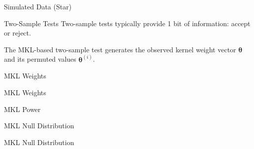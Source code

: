 \documentclass{beamer}
\begin{document}
\begin{frame}{Simulated Data (Star)}
  \begin{center}
    \resizebox{10.0cm}{!}{
      
    }
  \end{center}
\end{frame}

\begin{frame}{Two-Sample Tests}
  Two-sample tests typically provide 1 bit of information: accept or reject. \\ \pause

  The MKL-based two-sample test generates the observed kernel weight vector ${\boldsymbol \theta}$ and
  its permuted values ${\boldsymbol \theta}^{(i)}$.
\end{frame}

\begin{frame}{MKL Weights}
  \begin{center}
    \resizebox{10.0cm}{!}{
      
    }
  \end{center}
\end{frame}

\begin{frame}{MKL Weights}
  \begin{center}
    \resizebox{10.0cm}{!}{
      
    }
  \end{center}
\end{frame}

\begin{frame}{MKL Power}
  \begin{center}
    \resizebox{10.0cm}{!}{
      
    }
  \end{center}
\end{frame}

\begin{frame}{MKL Null Distribution}
  \begin{center}
    \resizebox{10.0cm}{!}{
      
    }
  \end{center}
\end{frame}

\begin{frame}{MKL Null Distribution}
  \begin{center}
    \resizebox{10.0cm}{!}{
      
    }
  \end{center}
\end{frame}
\end{document}
